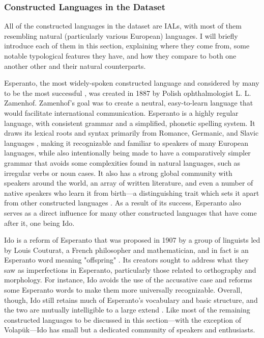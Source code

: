 \documentclass[12pt,a4paper]{article}
\numberwithin{figure}{section}
\numberwithin{table}{section}
\numberwithin{definition}{section}
\begin{document}
\subsubsection{Constructed Languages in the Dataset}
\label{ssec:constructedlanguagesinthedataset}


All of the constructed languages in the dataset are IALs, with most of them resembling natural (particularly various European) languages. I will briefly introduce each of them in this section, explaining where they come from, some notable typological features they have, and how they compare to both one another other and their natural counterparts.

Esperanto, the most widely-spoken constructed language and considered by many to be the most successful \parencite{Gobbo2008article}, was created in 1887 by Polish ophthalmologist L. L. Zamenhof. Zamenhof’s goal was to create a neutral, easy-to-learn language that would facilitate international communication. Esperanto is a highly regular language, with consistent grammar and a simplified, phonetic spelling system. It draws its lexical roots and syntax primarily from Romance, Germanic, and Slavic languages \parencite{Gobbo2008article,Gobbo2011article}, making it recognizable and familiar to speakers of many European languages, while also intentionally being made to have a comparatively simpler grammar that avoids some complexities found in natural languages, such as irregular verbs or noun cases. It also has a strong global community with speakers around the world, an array of written literature, and even a number of native speakers who learn it from birth---a distinguishing trait which sets it apart from other constructed languages \parencite{goodall2022article}. As a result of its success, Esperanto also serves as a direct influence for many other constructed languages that have come after it, one being Ido. 

Ido is a reform of Esperanto that was proposed in 1907 by a group of linguists led by Louis Couturat, a French philosopher and mathematician, and in fact is an Esperanto word meaning "offspring" \parencite{Schubert2001book}. Its creators sought to address what they saw as imperfections in Esperanto, particularly those related to orthography and morphology. For instance, Ido avoids the use of the accusative case and reforms some Esperanto words to make them more universally recognizable. Overall, though, Ido still retains much of Esperanto’s vocabulary and basic structure, and the two are mutually intelligible to a large extend \parencite{goodall2022article,Schubert2001book}. Like most of the remaining constructed languages to be discussed in this section---with the exception of Volapük---Ido has small but a dedicated community of speakers and enthusiasts.
\end{document}
